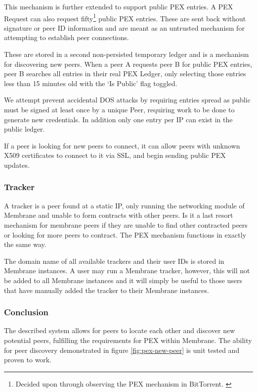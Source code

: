 \documentclass[11pt, a4paper, twocolumn, twoside]{report}
\begin{document}
This mechanism is further extended to support public PEX entries. A PEX Request can also request fifty\footnote{Decided upon through observing the PEX mechanism in BitTorrent. \citep{vuze2010vuze}} public PEX entries. These are sent back without signature or peer ID information and are meant as an untrusted mechanism for attempting to establish peer connections.

These are stored in a second non-persisted temporary ledger and is a mechanism for discovering new peers. When a peer A requests peer B for public PEX entries, peer B searches all entries in their real PEX Ledger, only selecting those entries less than 15 minutes old with the `Is Public' flag toggled.

We attempt prevent accidental DOS attacks by requiring entries spread as public must be signed at least once by a unique Peer, requiring work to be done to generate new credentials. In addition only one entry per IP can exist in the public ledger.

If a peer is looking for new peers to connect, it can allow peers with unknown X509 certificates to connect to it via SSL, and begin sending public PEX updates.

\subsubsection{Tracker}

A tracker is a peer found at a static IP, only running the networking module of Membrane and unable to form contracts with other peers. Is it a last resort mechanism for membrane peers if they are unable to find other contracted peers or looking for more peers to contract. The PEX mechanism functions in exactly the same way.

The domain name of all available trackers and their user IDs is stored in Membrane instances. A user may run a Membrane tracker, however, this will not be added to all Membrane instances and it will simply be useful to those users that have manually added the tracker to their Membrane instances.

\subsubsection{Conclusion}

The described system allows for peers to locate each other and discover new potential peers, fulfilling the requirements for PEX within Membrane. The ability for peer discovery demonstrated in figure \ref{fig:pex-new-peer} is unit tested and proven to work.
\end{document}

